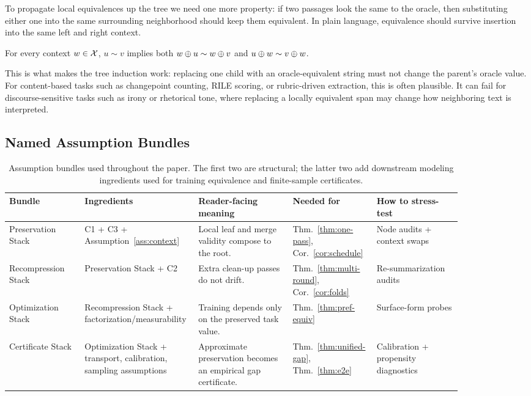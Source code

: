 To propagate local equivalences up the tree we need one more property: if two passages look the same to the oracle, then substituting either one into the same surrounding neighborhood should keep them equivalent. In plain language, equivalence should survive insertion into the same left and right context.

\begin{assumption}\label{ass:context}
For every context $w \in \mathcal{X}$, $u \sim v$ implies both $w \oplus u \sim w \oplus v$ and $u \oplus w \sim v \oplus w$.
\end{assumption}

This is what makes the tree induction work: replacing one child with an oracle-equivalent string must not change the parent's oracle value. For content-based tasks such as changepoint counting, RILE scoring, or rubric-driven extraction, this is often plausible. It can fail for discourse-sensitive tasks such as irony or rhetorical tone, where replacing a locally equivalent span may change how neighboring text is interpreted.

\subsection{Named Assumption Bundles}

\begin{table}[t]
\centering\footnotesize
\setlength{\tabcolsep}{3pt}
\begin{tabular}{p{0.16\linewidth}p{0.18\linewidth}p{0.20\linewidth}p{0.14\linewidth}p{0.18\linewidth}}
\toprule
Bundle & Ingredients & Reader-facing meaning & Needed for & How to stress-test \\
\midrule
Preservation Stack & C1 + C3 + Assumption~\ref{ass:context} & Local leaf and merge validity compose to the root. & Thm.~\ref{thm:one-pass}, Cor.~\ref{cor:schedule} & Node audits + context swaps \\
Recompression Stack & Preservation Stack + C2 & Extra clean-up passes do not drift. & Thm.~\ref{thm:multi-round}, Cor.~\ref{cor:folds} & Re-summarization audits \\
Optimization Stack & Recompression Stack + factorization/measurability & Training depends only on the preserved task value. & Thm.~\ref{thm:pref-equiv} & Surface-form probes \\
Certificate Stack & Optimization Stack + transport, calibration, sampling assumptions & Approximate preservation becomes an empirical gap certificate. & Thm.~\ref{thm:unified-gap}, Thm.~\ref{thm:e2e} & Calibration + propensity diagnostics \\
\bottomrule
\end{tabular}
\caption{Assumption bundles used throughout the paper. The first two are structural; the latter two add downstream modeling ingredients used for training equivalence and finite-sample certificates.}
\label{tab:assumption-bundles}
\end{table}

